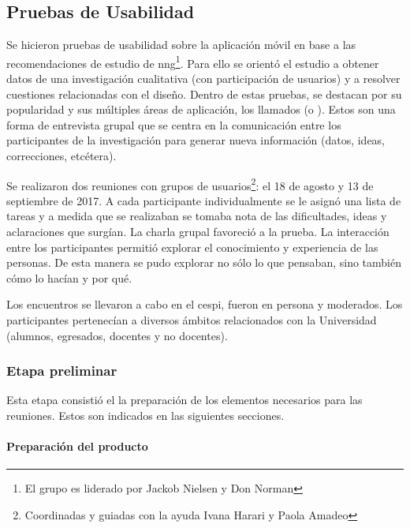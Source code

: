 \subsection{Pruebas de Usabilidad}
\label{desarrollo_pruebas_usabilidad}

Se hicieron pruebas de usabilidad sobre la aplicación móvil en base a las recomendaciones de estudio de \gls{nng}\cite{nng2017usabilityTest}\footnote{El grupo es liderado por Jackob Nielsen y Don Norman}. Para ello se orientó el estudio a obtener datos de una investigación cualitativa (con participación de usuarios) y a resolver cuestiones relacionadas con el diseño. 
Dentro de estas pruebas, se destacan por su popularidad y sus múltiples
áreas de aplicación, los llamados  (o ).
Estos son una forma de entrevista grupal que se centra en la comunicación entre los participantes de la investigación para generar nueva información (datos, ideas, correcciones, etcétera)\cite{kitzinger1995qualitative}.

Se realizaron dos reuniones con grupos de usuarios\footnote{Coordinadas y guiadas con la ayuda Ivana Harari y Paola Amadeo}: el 18 de agosto y 13 de septiembre de 2017. A cada participante individualmente se le asignó una lista de tareas y a medida que se realizaban se tomaba nota de las dificultades, ideas y aclaraciones que surgían. La charla grupal favoreció a la prueba. La interacción entre los participantes permitió explorar el conocimiento y experiencia de las personas. De esta manera se pudo explorar no sólo lo que pensaban, sino también cómo lo hacían y por qué.

Los encuentros se llevaron a cabo en el \gls{cespi}, fueron en persona y moderados. Los participantes pertenecían a diversos ámbitos relacionados con la Universidad (alumnos, egresados, docentes y no docentes).

\subsubsection{Etapa preliminar}
\label{desarrollo_pruebas_usabilidad_preparativos}

Esta etapa consistió el la preparación de los elementos necesarios para las reuniones. Estos son indicados en las siguientes secciones.

\paragraph{Preparación del producto}
\label{desarrollo_pruebas_usabilidad_preparativos_producto}

